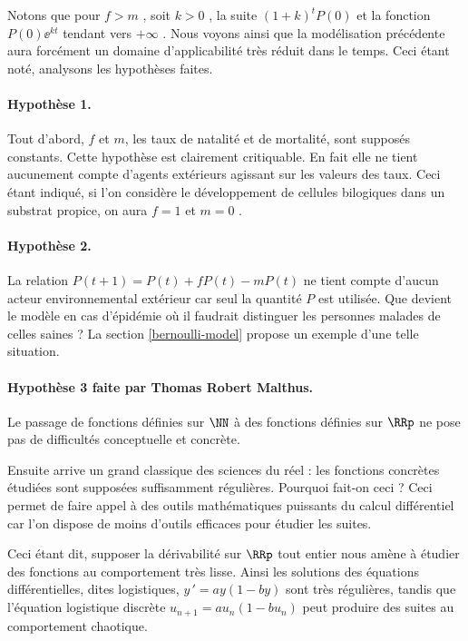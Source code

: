 Notons que pour $f > m$ , soit $k > 0$ , la suite $(1 + k)^t P(0)$ et la fonction $P(0) \ee^{kt}$ tendant vers $+\infty$ . Nous voyons ainsi que la modélisation précédente aura forcément un domaine d'applicabilité très réduit dans le temps. Ceci étant noté, analysons les hypothèses faites.


\paragraph{Hypothèse 1.} 
Tout d'abord, $f$ et $m$, les taux de natalité et de mortalité, sont supposés constants. Cette hypothèse est clairement critiquable. En fait elle ne tient aucunement compte d'agents extérieurs agissant sur les valeurs des taux. Ceci étant indiqué, si l'on considère le développement de cellules bilogiques dans un substrat propice, on aura $f = 1$ et $m = 0$ .



\paragraph{Hypothèse 2.} 
La relation $P(t+1) = P(t) + f P(t) - m P(t)$ ne tient compte d'aucun acteur environnemental extérieur car seul la quantité $P$ est utilisée. Que devient le modèle en cas d'épidémie où il faudrait distinguer les personnes malades de celles saines ? La section \ref{bernoulli-model} propose un exemple d'une telle situation. 
	
	
\paragraph{Hypothèse 3 faite par Thomas Robert Malthus.} Le passage de fonctions définies sur $\NN$ à des fonctions définies sur $\RRp$ ne pose pas de difficultés conceptuelle et concrète. 

\smallskip

Ensuite arrive un grand classique des sciences du réel : les fonctions concrètes étudiées sont supposées suffisamment régulières. Pourquoi fait-on ceci ? Ceci permet de faire appel à des outils mathématiques puissants du calcul différentiel car l'on dispose de moins d'outils efficaces pour étudier les suites. 

\smallskip

Ceci étant dit, supposer la dérivabilité sur $\RRp$ tout entier nous amène à étudier des fonctions au comportement très lisse.
Ainsi les solutions des équations différentielles, dites logistiques, $y\,' = a y (1 - b y)$ sont très régulières, tandis que l'équation logistique discrète $u_{n+1} = a u_n (1 - b u_n)$ peut produire des suites au comportement chaotique. 

